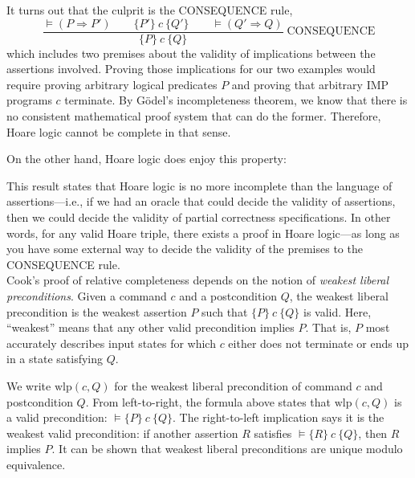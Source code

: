 It turns out that the culprit is the CONSEQUENCE rule,
\[
\frac{\models (P \Rightarrow P') \qquad \{P'\}\ c\ \{Q'\} \qquad \models (Q' \Rightarrow
Q)}{\{P\}\ c\ \{Q\}} \; \text{CONSEQUENCE}
\]
which includes two premises about the validity of implications between the assertions
involved. Proving those implications for our two examples would require proving arbitrary
logical predicates $P$ and proving that arbitrary IMP programs $c$ terminate. By G\"odel's
incompleteness theorem, we know that there is no consistent mathematical proof system that can
do the former. Therefore, Hoare logic cannot be complete in that sense.

On the other hand, Hoare logic does enjoy this property:


This result states that Hoare logic is no more incomplete than the language of assertions---i.e., if we
had an oracle that could decide the validity of assertions, then we could decide the validity
of partial correctness specifications. In other words, for any valid Hoare triple, there exists
a proof in Hoare logic---as long as you have some external way to decide the validity of the
premises to the CONSEQUENCE rule.\\

Cook's proof of relative completeness depends on the notion of \emph{weakest liberal
preconditions}. Given a command $c$ and a postcondition $Q$, the weakest liberal precondition
is the weakest assertion $P$ such that $\{P\}\ c\ \{Q\}$ is valid. Here, ``weakest'' means that
any other valid precondition implies $P$. That is, $P$ most accurately describes input states
for which $c$ either does not terminate or ends up in a state satisfying $Q$.



We write $\mathrm{wlp}(c, Q)$ for the weakest liberal precondition of command $c$ and
postcondition $Q$. From left-to-right, the formula above states that $\mathrm{wlp}(c, Q)$ is a
valid precondition: $\models \{P\}\ c\ \{Q\}$. The right-to-left implication says it is the
weakest valid precondition: if another assertion $R$ satisfies $\models \{R\}\ c\ \{Q\}$, then
$R$ implies $P$. It can be shown that weakest liberal preconditions are unique modulo
equivalence.

